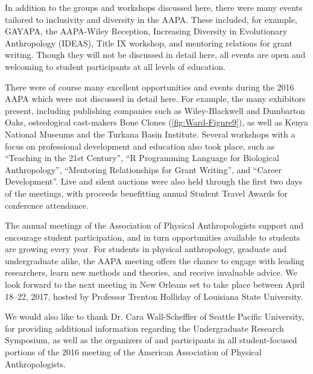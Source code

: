 In addition to the groups and workshops discussed here, there were many events tailored to inclusivity and diversity in the AAPA.
These included, for example, GAYAPA, the AAPA-Wiley Reception, Increasing Diversity in Evolutionary Anthropology (IDEAS),
Title IX workshop, and mentoring relations for grant writing.  
Though they will not be discussed in detail here, all events are open and welcoming to student participants at all levels of education.

There  were of course many excellent opportunities and events during the 2016 AAPA which were not discussed in detail here.
For example, the many exhibitors present, including publishing companies such as Wiley-Blackwell and Dumbarton Oaks,
osteological cast-makers Bone Clones (\cref{fig:Ward-Figure9}), as well as Kenya National Museums and the Turkana Basin Institute. 
Several workshops with a focus on professional development and education also took place, such as “Teaching in the 21st Century”,
“R Programming Language for Biological Anthropology”, “Mentoring Relationships for Grant Writing”, and  “Career Development”.
Live and silent auctions were also held through the first two days of the meetings, 
with proceeds benefitting annual Student Travel Awards for conference attendance.


The annual meetings of the Association of Physical Anthropologists support and encourage student participation,
and in turn opportunities available to students are growing every year. For students in physical anthropology, 
graduate and undergraduate alike, the AAPA meeting offers the chance to engage with leading researchers,
learn new methods and theories, and receive invaluable advice. 
We look forward to the next meeting in New Orleans set to take place between April 18--22, 2017, 
hosted by Professor Trenton Holliday of Louisiana State University.

We  would also like to thank Dr. Cara Wall-Scheffler of Seattle Pacific University,  
for providing additional information regarding the Undergraduate Research Symposium,
as well as the organizers of and participants in all student-focused portions of the 2016 meeting of
the American Association of Physical Anthropologists.
\IJSRAclosing%
%

